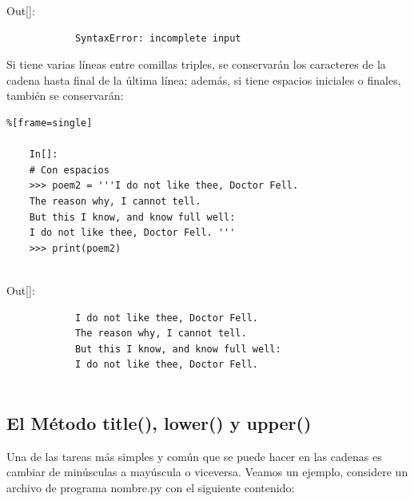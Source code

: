 {\ttfamily\scriptsize\scriptsize 
	\hspace{-0.65cm}Out[]:\vspace{-0.15cm}	
	{\color{red} 	
		\begin{verbatim}		
			SyntaxError: incomplete input
		\end{verbatim}
}}

Si tiene varias líneas entre comillas triples, se conservarán los caracteres de la cadena hasta final de la última línea; además, si tiene espacios iniciales o finales, también se conservarán:
\begin{lstlisting}%[frame=single]
	
	In[]:
	# Con espacios 
	>>> poem2 = '''I do not like thee, Doctor Fell.
	The reason why, I cannot tell.
	But this I know, and know full well:
	I do not like thee, Doctor Fell. '''
	>>> print(poem2)
	
\end{lstlisting}

{\ttfamily\scriptsize\scriptsize 
	\hspace{-0.65cm}Out[]:\vspace{-0.15cm}	
	{\color{blue} 	
		\begin{verbatim}		
			I do not like thee, Doctor Fell.
			The reason why, I cannot tell.
			But this I know, and know full well:
			I do not like thee, Doctor Fell.
			
		\end{verbatim}
}}


\subsection{El Método {\ttfamily title()}, {\ttfamily lower()} y {\ttfamily upper()}}	%



Una de las tareas más simples y común que se puede hacer  en las cadenas es cambiar de minúsculas a mayúscula o 
viceversa. Veamos un ejemplo, considere un archivo  de programa {\ttfamily  nombre.py}   con el siguiente contenido:

